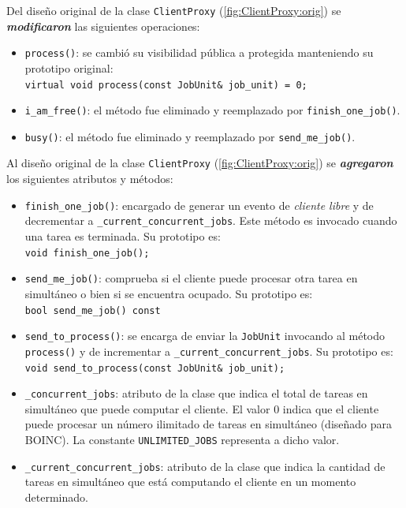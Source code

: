 Del diseño original de la clase \texttt{ClientProxy} (\ref{fig:ClientProxy:orig}) se \textit{\textbf{modificaron}} las siguientes operaciones:
\begin{itemize}
\item \texttt{process()}: se cambió su visibilidad pública a protegida manteniendo su prototipo original:\\
\texttt{virtual void process(const JobUnit\& job\_unit) = 0;}

\item \texttt{i\_am\_free()}: el método fue eliminado y reemplazado por \texttt{finish\_one\_job()}.

\item \texttt{busy()}: el método fue eliminado y reemplazado por \texttt{send\_me\_job()}.
\end{itemize}

Al diseño original de la clase \texttt{ClientProxy} (\ref{fig:ClientProxy:orig}) se \textit{\textbf{agregaron}} los siguientes atributos y métodos:

\begin{itemize}
\item \texttt{finish\_one\_job()}: encargado de generar un evento de \textit{cliente libre} y de decrementar a \texttt{\_current\_concurrent\_jobs}. Este método es invocado cuando una tarea es terminada. Su prototipo es:\\
\texttt{void finish\_one\_job();}

\item \texttt{send\_me\_job()}: comprueba si el cliente puede procesar otra tarea en simultáneo o bien si se encuentra ocupado. Su prototipo es:\\
\texttt{bool send\_me\_job() const}

\item \texttt{send\_to\_process()}: se encarga de enviar la \texttt{JobUnit} invocando al método \texttt{process()} y de incrementar a \texttt{\_current\_concurrent\_jobs}. Su prototipo es:\\
\texttt{void send\_to\_process(const JobUnit\& job\_unit);}

\item \texttt{\_concurrent\_jobs}: atributo de la clase que indica el total de tareas en simultáneo que puede computar el cliente. El valor 0 indica que el cliente puede procesar un número ilimitado de tareas en simultáneo (diseñado para BOINC). La constante \texttt{UNLIMITED\_JOBS} representa a dicho valor.

\item \texttt{\_current\_concurrent\_jobs}: atributo de la clase que indica la cantidad de tareas en simultáneo que está computando el cliente en un momento determinado.
\end{itemize}

